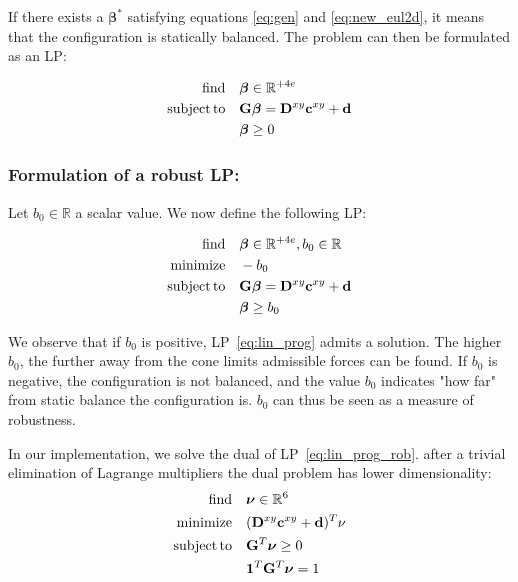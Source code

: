 If there exists a $\bm{\beta}^*$ satisfying equations \ref{eq:gen} and \ref{eq:new_eul2d}, it means that the configuration is statically balanced.
The problem can then be formulated as an LP:

\begin{equation} \label{eq:lin_prog} \begin{aligned}
\find \quad & \bm{\beta} \in \Rv{+4e} \\
\st \quad &\mathbf{G} \bm{\beta} = \mathbf{D}^{xy} \mathbf{c}^{xy} + \mathbf{d} \\
& \bm{\beta} \ge 0 \\
\end{aligned} \end{equation}

\subsubsection{Formulation of a robust LP:}
Let $b_0 \in \mathbb{R}$ a scalar value. We now define the following LP:

\begin{equation} \label{eq:lin_prog_rob} \begin{aligned}
\find \quad & \bm{\beta} \in \Rv{+4e}, b_0 \in \Rv{} \\
\minimize  \quad & -b_0 \\
\st \quad &\mathbf{G} \bm{\beta} = \mathbf{D}^{xy} \mathbf{c}^{xy} + \mathbf{d} \\
& \bm{\beta} \ge b_0 \\
\end{aligned} \end{equation}

We observe that if $b_0$ is positive, LP~\ref{eq:lin_prog} admits a solution. The higher $b_0$, the further away from the cone limits admissible forces can be found. If $b_0$ is negative, the configuration is not balanced, and the value $b_0$ indicates "how far" from static balance
the configuration is. $b_0$ can thus be seen as a measure of robustness.

In our implementation, we solve the dual of LP~\ref{eq:lin_prog_rob}.
after a trivial elimination of Lagrange multipliers the dual problem has lower dimensionality:
\begin{equation} \label{eq:dual} \begin{aligned}
\find \quad & \bm{\nu} \in \Rv{6}\\
\minimize  \quad & (\mathbf{D}^{xy} \mathbf{c}^{xy} + \mathbf{d})^T \nu \\
\st \quad &\mathbf{G}^T \bm{\nu} \ge 0 \\
& \mathbf{1}^T \mathbf{G}^T \bm{\nu} = 1 \\
\end{aligned} \end{equation}

